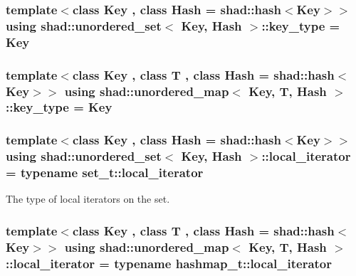 \hypertarget{group__Types_gae860c65ed861f8aa69b0360638f4ad5d}{
\subsubsection[{key\-\_\-type}]{\setlength{\rightskip}{0pt plus 5cm}template$<$class Key , class Hash  = shad\-::hash$<$\-Key$>$$>$ using {\bf shad\-::unordered\-\_\-set}$<$ Key, Hash $>$\-::key\-\_\-type =  Key}}\label{group__Types_gae860c65ed861f8aa69b0360638f4ad5d}
\hypertarget{group__Types_gac2a5bb16d47a5da2d493616e6fa5a73c}{
\subsubsection[{key\-\_\-type}]{\setlength{\rightskip}{0pt plus 5cm}template$<$class Key , class T , class Hash  = shad\-::hash$<$\-Key$>$$>$ using {\bf shad\-::unordered\-\_\-map}$<$ Key, T, Hash $>$\-::key\-\_\-type =  Key}}\label{group__Types_gac2a5bb16d47a5da2d493616e6fa5a73c}
\hypertarget{group__Types_gae1ee2e5ce1b39afa3cb1ce248747324d}{
\subsubsection[{local\-\_\-iterator}]{\setlength{\rightskip}{0pt plus 5cm}template$<$class Key , class Hash  = shad\-::hash$<$\-Key$>$$>$ using {\bf shad\-::unordered\-\_\-set}$<$ Key, Hash $>$\-::local\-\_\-iterator =  typename set\-\_\-t\-::local\-\_\-iterator}}\label{group__Types_gae1ee2e5ce1b39afa3cb1ce248747324d}


The type of local iterators on the set. 

\hypertarget{group__Types_ga520d395c30b2b19179153108ea694cec}{
\subsubsection[{local\-\_\-iterator}]{\setlength{\rightskip}{0pt plus 5cm}template$<$class Key , class T , class Hash  = shad\-::hash$<$\-Key$>$$>$ using {\bf shad\-::unordered\-\_\-map}$<$ Key, T, Hash $>$\-::local\-\_\-iterator =  typename hashmap\-\_\-t\-::local\-\_\-iterator}}\label{group__Types_ga520d395c30b2b19179153108ea694cec}


